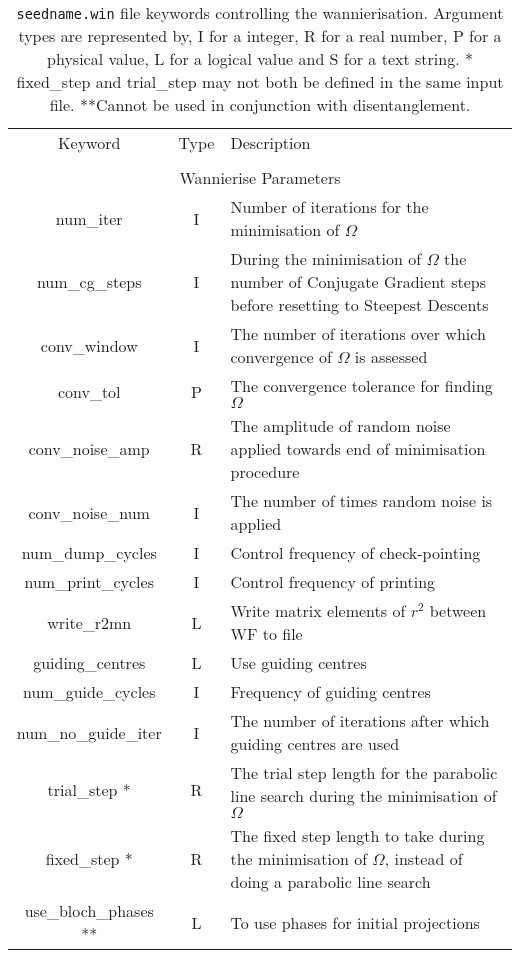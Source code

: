 \begin{table}
\begin{center}
\begin{tabular}{|c|c|p{6cm}|}
\hline
Keyword & Type & Description \\
        &      &             \\
\hline\hline
\multicolumn{3}{|c|}{Wannierise Parameters} \\
\hline
{\sc num\_iter }   & I & Number of iterations for the minimisation
of $\Omega$ \\
{\sc num\_cg\_steps }   & I & During the minimisation
of $\Omega$ the number of Conjugate Gradient steps before resetting to
Steepest Descents \\
{\sc conv\_window }   & I & The number of iterations over which
convergence of $\Omega$ is assessed \\
{\sc conv\_tol }   & P & The convergence tolerance for finding $\Omega$  \\
{\sc conv\_noise\_amp} & R & The amplitude of random noise applied
towards end of minimisation procedure \\
{\sc conv\_noise\_num} & I & The number of times random noise is
applied \\
{\sc num\_dump\_cycles }   & I & Control frequency of check-pointing \\
{\sc num\_print\_cycles }   & I & Control frequency of printing \\
{\sc write\_r2mn }   & L & Write matrix elements of $r^2$ between
WF to file \\
{\sc guiding\_centres }   & L & Use guiding centres \\
{\sc num\_guide\_cycles }   & I & Frequency of guiding centres \\
{\sc num\_no\_guide\_iter }   & I & The number of iterations
after which guiding centres are used\\
{\sc trial\_step }*   & R & The trial step length for the parabolic
line search during the minimisation
of $\Omega$\\
{\sc fixed\_step }*   & R & The fixed step length to take during the minimisation
of $\Omega$, instead of doing a parabolic line search \\
{\sc use\_bloch\_phases }**   & L & To use phases for initial projections \\
\hline
\end{tabular}
\caption[Parameter file keywords controlling the Wannierise routine.]
{{\tt seedname.win} file keywords controlling the wannierisation.
  Argument types 
are represented by, I for a integer, R for a real number, P for a
physical value, L for a logical value and S for a text string. 
{\footnotesize
* {\sc fixed\_step } and  {\sc trial\_step } may not both be defined in
the same input file. **Cannot be used in conjunction with disentanglement.}}
\label{parameter_keywords5}
\end{center}
\end{table}



